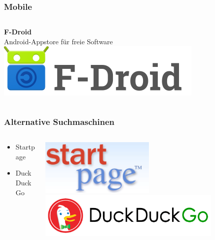 \documentclass[12pt, table]{beamer}
\begin{document}
\begin{frame}
	\frametitle{Mobile}
	\begin{columns}
    \column{6.5cm}
    \textbf{F-Droid}\\
    Android-Appstore für freie Software
    \includegraphics{../img/fdroid.png}
    \end{columns}
\end{frame}

\begin{frame}
	\frametitle{Alternative Suchmaschinen}
	\begin{columns}
		\begin{column}{5cm}
			\begin{center}
				\begin{itemize}
					\item Startpage
					\vspace{2cm}
					\item DuckDuckGo
				\end{itemize}
			\end{center}
		\end{column}
		\begin{column}{5cm}
			\begin{center}
				\includegraphics[width=0.5\textwidth]{../img/startp_logo.png}
				\vspace{1cm}
				\includegraphics[width=0.8\textwidth]{../img/duckduckgo.png}
			\end{center}
		\end{column}
	\end{columns}
\end{frame}
\end{document}
